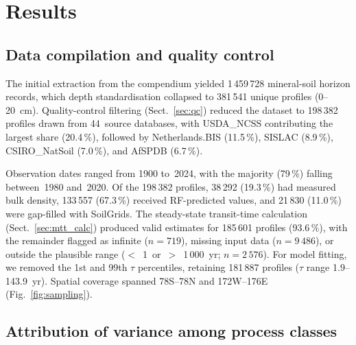 \documentclass[12pt, a4paper]{article}
\begin{document}
\section{Results}

\subsection{Data compilation and quality control}
\label{sec:results_data}

The initial extraction from the compendium yielded 1\,459\,728
mineral-soil horizon records, which depth standardisation collapsed to
381\,541 unique profiles (0--20~cm). Quality-control filtering
(Sect.~\ref{sec:qc}) reduced the dataset to 198\,382 profiles drawn from
44~source databases, with USDA\_NCSS contributing the largest share
(20.4\,\%), followed by Netherlands.BIS (11.5\,\%), SISLAC (8.9\,\%),
CSIRO\_NatSoil (7.0\,\%), and AfSPDB (6.7\,\%).

Observation dates ranged from 1900 to~2024,
with the majority (79\,\%) falling between~1980 and~2020. Of the
198\,382 profiles, 38\,292 (19.3\,\%) had measured bulk density, 133\,557
(67.3\,\%) received RF-predicted values, and 21\,830 (11.0\,\%) were
gap-filled with SoilGrids. The steady-state transit-time calculation
(Sect.~\ref{sec:mtt_calc}) produced valid estimates for 185\,601 profiles
(93.6\,\%), with the remainder flagged as infinite ($n = 719$), missing
input data ($n = 9\,486$), or outside the plausible range
($<$~1~or~$>$~1\,000~yr; $n = 2\,576$). For model fitting, we removed
the 1st and 99th $\tau$ percentiles, retaining 181\,887 profiles
($\tau$ range 1.9--143.9~yr). Spatial coverage spanned
78\textdegree S--78\textdegree N and 172\textdegree W--176\textdegree E
(Fig.~\ref{fig:sampling}).

\subsection{Attribution of variance among process classes}
\label{sec:results_models}
\end{document}
